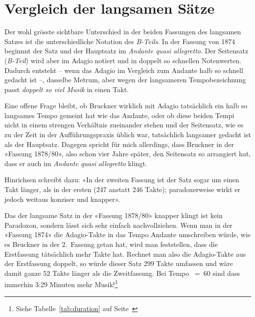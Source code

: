 \section{Vergleich der langsamen Sätze}

Der wohl grösste sichtbare Unterschied in der beiden Fassungen des langsamen Satzes ist die unterschiedliche Notation des \emph{B-Teils}.
In der Fassung von 1874 beginnnt der Satz und der Hauptsatz im \emph{Andante quasi allegretto}.
Der Seitensatz (\emph{B-Teil}) wird aber im Adagio notiert und in doppelt so schnellen Notenwerten.
Dadurch entsteht -- wenn das Adagio im Vergleich zum Andante halb so schnell gedacht ist --, dasselbe Metrum, aber wegen der langsameren Tempobezeichnung passt \emph{doppelt so viel Musik} in einen Takt.

Eine offene Frage bleibt, ob Bruckner wirklich mit Adagio tatsächlich ein halb so langsames Tempo gemeint hat wie das Andante, oder ob diese beiden Tempi nicht in einem strengen Verhältnis zueinander stehen und der Seitensatz, wie es zu der Zeit in der Aufführungspraxis üblich war, tatsächlich langsamer gedacht ist als der Hauptsatz.
Dagegen spricht für mich allerdings, dass Bruckner in der «Fassung 1878/80», also schon vier Jahre später, den Seitensatz so arrangiert hat, dass er auch im \emph{Andante quasi allegretto} klingt.

Hinrichsen schreibt dazu: «In der zweiten Fassung ist der Satz sogar um einen Takt länger, als in der ersten (247 anstatt 246 Takte); paradoxerweise wirkt er jedoch weitaus konziser und knapper»\autocite[76]{hinrichsen:bruckner}.

Das der langsame Satz in der «Fassung 1878/80» knapper klingt ist kein Paradoxon, sondern lässt sich sehr einfach nachvollziehen.
Wenn man in der «Fassung 1874» die Adagio-Takte in das Tempo Andante umschreiben würde, wie es Bruckner in der 2.~Fassung getan hat, wird man feststellen, dass die Erstfassung tätsächlich mehr Takte hat.
Rechnet man also die Adagio-Takte aus der Erstfassung doppelt, so würde dieser Satz 299 Takte umfassen und wäre damit ganze 52 Takte länger als die Zweitfassung.
Bei Tempo \quarternote~=~60 sind dass immerhin 3:29 Minuten mehr Musik!\footnote{Siehe Tabelle~\ref{tab:duration} auf Seite~\pageref{tab:duration}}

